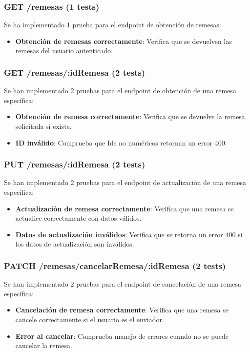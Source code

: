 \subsubsection{GET /remesas (1 tests)}
Se ha implementado 1 prueba para el endpoint de obtención de remesas:
\begin{itemize}
    \item \textbf{Obtención de remesas correctamente}: Verifica que se devuelven las remesas del usuario autenticado.
\end{itemize}

\subsubsection{GET /remesas/:idRemesa (2 tests)}
Se han implementado 2 pruebas para el endpoint de obtención de una remesa específica:
\begin{itemize}
    \item \textbf{Obtención de remesa correctamente}: Verifica que se devuelve la remesa solicitada si existe.
    \item \textbf{ID inválido}: Comprueba que Ids no numéricos retornan un error 400.
\end{itemize}

\subsubsection{PUT /remesas/:idRemesa (2 tests)}
Se han implementado 2 pruebas para el endpoint de actualización de una remesa específica:
\begin{itemize}
    \item \textbf{Actualización de remesa correctamente}: Verifica que una remesa se actualice correctamente con datos válidos.
    \item \textbf{Datos de actualización inválidos}: Verifica que se retorna un error 400 si los datos de actualización son inválidos.
\end{itemize}

\subsubsection{PATCH /remesas/cancelarRemesa/:idRemesa (2 tests)}
Se han implementado 2 pruebas para el endpoint de cancelación de una remesa específica:
\begin{itemize}
    \item \textbf{Cancelación de remesa correctamente}: Verifica que una remesa se cancele correctamente si el usuario es el enviador.
    \item \textbf{Error al cancelar}: Comprueba manejo de errores cuando no se puede cancelar la remesa.
\end{itemize}

